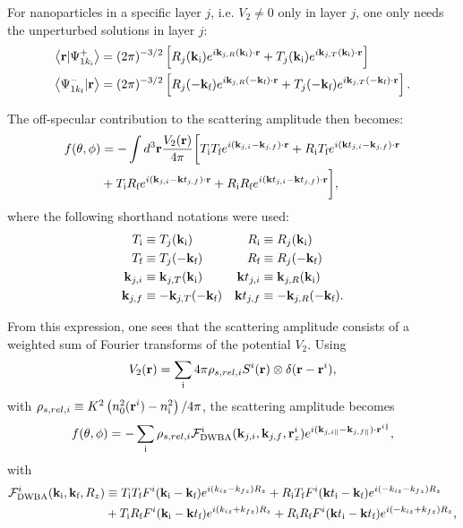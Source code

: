 For nanoparticles in a specific layer $j$, i.e. $V_2\neq0$ only in layer $j$, one only needs the unperturbed solutions in layer $j$:
\begin{align*}
  \left\langle \mathbf{r} \vert \Psi^+_{1k_\text{i}} \right\rangle &= (2\pi)^{-3/2}\left[ R_j(\mathbf{k}_\text{i}) e^{i \mathbf{k}_{j,R}(\mathbf{k}_\text{i})\cdot\mathbf{r}} + T_j(\mathbf{k}_\text{i}) e^{i \mathbf{k}_{j,T}(\mathbf{k}_\text{i})\cdot\mathbf{r}} \right] \\
  \left\langle \Psi^-_{1k_\text{f}} \vert \mathbf{r} \right\rangle &= (2\pi)^{-3/2}\left[ R_j(-\mathbf{k}_\text{f}) e^{i \mathbf{k}_{j,R}(-\mathbf{k}_\text{f})\cdot\mathbf{r}} + T_j(-\mathbf{k}_\text{f}) e^{i \mathbf{k}_{j,T}(-\mathbf{k}_\text{f})\cdot\mathbf{r}} \right].
\end{align*}

The off-specular contribution to the scattering amplitude then becomes:
\begin{align*}
  f(\theta, \phi) &= -\int d^3\mathbf{r} \frac{V_2(\mathbf{r})}{4\pi} \biggl[ T_\text{i}T_\text{f}e^{i(\mathbf{k}_{j,i}-\mathbf{k}_{j,f})\cdot\mathbf{r}} + R_\text{i}T_\text{f}e^{i(\mathbf{k} t_{j,i}-\mathbf{k}_{j,f})\cdot\mathbf{r}} \\
   & + T_\text{i}R_\text{f}e^{i(\mathbf{k}_{j,i}-\mathbf{k} t_{j,f})\cdot\mathbf{r}} + R_\text{i}R_\text{f}e^{i(\mathbf{k} t_{j,i}-\mathbf{k} t_{j,f})\cdot\mathbf{r}} \biggr],
\end{align*}
where the following shorthand notations were used:
\begin{align*}
  T_\text{i} &\equiv  T_j(\mathbf{k}_\text{i}) & R_\text{i} &\equiv  R_j(\mathbf{k}_\text{i})  \\
  T_\text{f} &\equiv  T_j(-\mathbf{k}_\text{f}) & R_\text{f} &\equiv  R_j(-\mathbf{k}_\text{f}) \\
  \mathbf{k}_{j,i} &\equiv \mathbf{k}_{j,T}(\mathbf{k}_\text{i}) & \mathbf{k} t_{j,i} &\equiv \mathbf{k}_{j,R}(\mathbf{k}_\text{i})  \\
  \mathbf{k}_{j,f} &\equiv -\mathbf{k}_{j,T}(-\mathbf{k}_\text{f}) & \mathbf{k} t_{j,f} &\equiv -\mathbf{k}_{j,R}(-\mathbf{k}_\text{f}).
\end{align*}

From this expression, one sees that the scattering amplitude consists of a weighted sum of Fourier transforms of the potential $V_2$. Using
\begin{equation*}
  V_2(\mathbf{r}) = \sum_\text{i} 4\pi \rho_{s,rel,i} S^i(\mathbf{r}) \otimes \delta(\mathbf{r} - \mathbf{r}^i),
\end{equation*}
with $\rho_{s,rel,i}\equiv  K^2\left( n_0^2(\mathbf{r}^i) - n_\text{i}^2 \right)/4\pi$, the scattering amplitude becomes
\begin{equation*}
  f(\theta, \phi) = -\sum_\text{i}  \rho_{s,rel,i} \mathcal{F}^i_{\text{DWBA}}(\mathbf{k}_{j,i},\mathbf{k}_{j,f},\mathbf{r}^i_z)e^{i(\mathbf{k}_{j,i\parallel}-\mathbf{k}_{j,f\parallel})\cdot \mathbf{r}^{i\parallel} },
\end{equation*}
with
\begin{align*}
  \mathcal{F}^i_\text{DWBA}(\mathbf{k}_\text{i},\mathbf{k}_\text{f},R_z) & \equiv T_\text{i}T_\text{f}F^i(\mathbf{k}_\text{i}-\mathbf{k}_\text{f})e^{i(k_{iz}-k_{fz})R_z} + R_\text{i}T_\text{f}F^i(\mathbf{k} t_\text{i}-\mathbf{k}_\text{f})e^{i(-k_{iz}-k_{fz})R_z} \\
  & + T_\text{i}R_\text{f}F^i(\mathbf{k}_\text{i}-\mathbf{k} t_\text{f})e^{i(k_{iz}+k_{fz})R_z} + R_\text{i}R_\text{f}F^i(\mathbf{k} t_\text{i}-\mathbf{k} t_\text{f})e^{i(-k_{iz}+k_{fz})R_z},
\end{align*}

